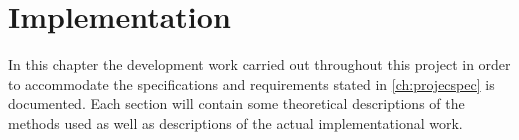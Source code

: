 \graphicspath{{figures/implementation/}}
\chapter{Implementation}\label{ch:implementation}\glsresetall

In this chapter the development work carried out throughout this project in order to accommodate the specifications and requirements stated in \autoref{ch:projecspec} is documented. Each section will contain some theoretical descriptions of the methods used as well as descriptions of the actual implementational work. 







